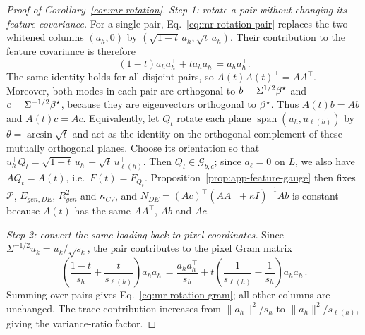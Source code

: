 {\begin{proof}[Proof of Corollary~\ref{cor:mr-rotation}]
\emph{Step 1: rotate a pair without changing its feature covariance.}
For a single pair, Eq.~\ref{eq:mr-rotation-pair} replaces the two whitened
columns $(a_h,0)$ by $(\sqrt{1-t}\,a_h,\sqrt t\,a_h)$.  Their contribution
to the feature covariance is therefore
\[
(1-t)a_ha_h^\top+t a_ha_h^\top=a_ha_h^\top.
\]
The same identity holds for all disjoint pairs, so
$A(t)A(t)^\top=AA^\top$.  Moreover, both modes in each pair are orthogonal
to $b=\Sigma^{1/2}{\beta^{\star}}$ and $c=\Sigma^{-1/2}{\beta^{\star}}$, because they are
eigenvectors orthogonal to ${\beta^{\star}}$.  Thus $A(t)b=Ab$ and $A(t)c=Ac$.
Equivalently, let $Q_t$ rotate each plane
$\operatorname{span}(u_h,u_{\ell(h)})$ by $\theta=\arcsin\sqrt t$ and act as the
identity on the orthogonal complement of these mutually orthogonal planes.
Choose its orientation so that
$u_h^\top Q_t=\sqrt{1-t}\,u_h^\top+\sqrt t\,u_{\ell(h)}^\top$.
Then $Q_t\in\mathcal G_{b,c}$; since $a_\ell=0$ on $L$, we also have
$AQ_t=A(t)$, i.e.\ $F(t)=F_{Q_t}$.
Proposition~\ref{prop:app-feature-gauge} then fixes $\mathcal P$,
$E_{gen,DE}$, $R^2_{gen}$ and $\kappa_{CV}$, and
$N_{DE}=(Ac)^\top(AA^\top+\kappa I)^{-1}Ab$ is constant because $A(t)$ has the
same $AA^\top$, $Ab$ and $Ac$.

\emph{Step 2: convert the same loading back to pixel coordinates.}
Since $\Sigma^{-1/2}u_k=u_k/\sqrt{s_k}$, the pair contributes to the
pixel Gram matrix
\[
\left(\frac{1-t}{s_h}+\frac{t}{s_{\ell(h)}}\right)a_ha_h^\top
=\frac{a_ha_h^\top}{s_h}
+t\left(\frac{1}{s_{\ell(h)}}-\frac{1}{s_h}\right)a_ha_h^\top.
\]
Summing over pairs gives Eq.~\ref{eq:mr-rotation-gram}; all other columns
are unchanged.  The trace contribution increases from $\|a_h\|^2/s_h$
to $\|a_h\|^2/s_{\ell(h)}$, giving the variance-ratio factor.


\end{proof}}
